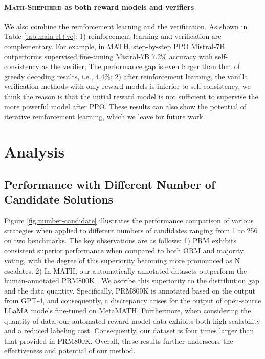 \documentclass{article} %
\newcommand{\methodname}{\textsc{Math-Shepherd}\xspace}
\begin{document}
\paragraph{\methodname as both reward models and verifiers}
We also combine the reinforcement learning and the verification.
As shown in Table \ref{tab:main-rl+ve}:
1) reinforcement learning and verification are complementary. For example, in MATH, step-by-step PPO Mistral-7B outperforms supervised fine-tuning Mistral-7B 7.2\% accuracy with self-consistency as the verifier;
The performance gap is even larger than that of greedy decoding results, i.e., 4.4\%;
2) after reinforcement learning, the vanilla verification methods with only reward models is inferior to self-consistency, we think the reason is that the initial reward model is not sufficient to supervise the more powerful model after PPO.
These results can also show the potential of iterative reinforcement learning, which we leave for future work.

\section{Analysis}


\subsection{Performance with Different Number of Candidate Solutions}
Figure \ref{fig:number-candidate} illustrates the performance comparison of various strategies when applied to different numbers of candidates ranging from 1 to 256 on two benchmarks. The key observations are as follows:
1) PRM exhibits consistent superior performance when compared to both ORM and majority voting, with the degree of this superiority becoming more pronounced as N escalates.
2) In MATH, our automatically annotated datasets outperform the human-annotated PRM800K \citep{lightman2023let}. We ascribe this superiority to the distribution gap and the data quantity. Specifically, PRM800K is annotated based on the output from GPT-4, and consequently, a discrepancy arises for the output of open-source LLaMA models fine-tuned on MetaMATH. Furthermore, when considering the quantity of data, our automated reward model data exhibits both high scalability and a reduced labeling cost. Consequently, our dataset is four times larger than that provided in PRM800K.
Overall, these results further underscore the effectiveness and potential of our method.
\end{document}
